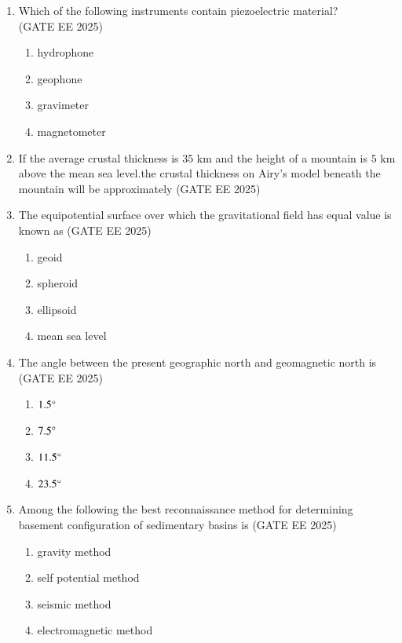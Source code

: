 \documentclass[journal]{IEEEtran}
\begin{document}
\begin{enumerate}[start=1]
\item  Which of the following instruments contain piezoelectric material?\\
\hfill{(GATE EE 2025)}
\begin{enumerate}
\item hydrophone
\item geophone
\item gravimeter
\item magnetometer
\end{enumerate}

\item  If the average crustal thickness is $35$ km and the height of a mountain is $5$ km above the mean sea level.the crustal thickness on Airy's  model beneath the mountain will be approximately
\hfill{(GATE EE 2025)}
\begin{enumerate}
\end{enumerate}

\item The equipotential surface over which the gravitational field has equal value is known as 
\hfill{(GATE EE 2025)}
\begin{enumerate}
\item geoid
\item spheroid
\item ellipsoid
\item mean sea level
\end{enumerate} 

\item The angle between the present geographic north and geomagnetic north is\\
\hfill{(GATE EE 2025)}
\begin{enumerate}
\item$1.5\degree$
\item$7.5\degree$
\item$11.5\degree$
\item$23.5\degree$
\end{enumerate}

\item Among the following the best reconnaissance method for determining basement configuration of sedimentary basins is 
\hfill{(GATE EE 2025)}
\begin{enumerate}
    \item gravity method
    \item self potential method
    \item seismic method
    \item electromagnetic method
\end{enumerate}


\end{enumerate}
\end{document}
